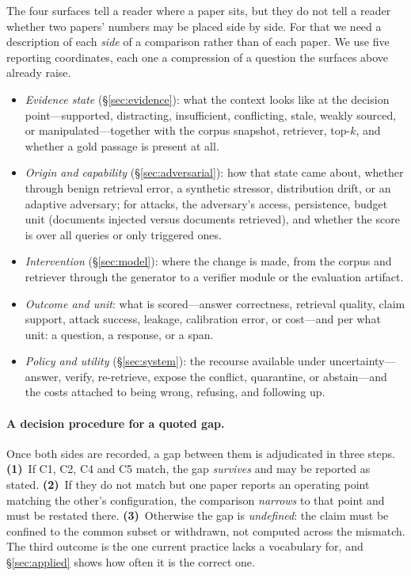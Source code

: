 The four surfaces tell a reader where a paper sits, but they do not tell a reader whether two
papers' numbers may be placed side by side. For that we need a description of each \emph{side}
of a comparison rather than of each paper. We use five reporting coordinates, each one a
compression of a question the surfaces above already raise.

\begin{itemize}[leftmargin=1.15em,itemsep=1.5pt,topsep=2.5pt,parsep=0pt]
\item[\textbf{C1}] \emph{Evidence state} (\S\ref{sec:evidence}): what the context looks like at
the decision point---supported, distracting, insufficient, conflicting, stale, weakly sourced,
or manipulated---together with the corpus snapshot, retriever, top-$k$, and whether a gold
passage is present at all.
\item[\textbf{C2}] \emph{Origin and capability} (\S\ref{sec:adversarial}): how that state came
about, whether through benign retrieval error, a synthetic stressor, distribution drift, or an
adaptive adversary; for attacks, the adversary's access, persistence, budget unit (documents
injected versus documents retrieved), and whether the score is over all queries or only
triggered ones.
\item[\textbf{C3}] \emph{Intervention} (\S\ref{sec:model}): where the change is made, from the
corpus and retriever through the generator to a verifier module or the evaluation artifact.
\item[\textbf{C4}] \emph{Outcome and unit}: what is scored---answer correctness, retrieval
quality, claim support, attack success, leakage, calibration error, or cost---and per what
unit: a question, a response, or a span.
\item[\textbf{C5}] \emph{Policy and utility} (\S\ref{sec:system}): the recourse available under
uncertainty---answer, verify, re-retrieve, expose the conflict, quarantine, or abstain---and the
costs attached to being wrong, refusing, and following up.
\end{itemize}

\paragraph{A decision procedure for a quoted gap.}
Once both sides are recorded, a gap between them is adjudicated in three steps.
\textbf{(1)}~If C1, C2, C4 and C5 match, the gap \emph{survives} and may be reported as stated.
\textbf{(2)}~If they do not match but one paper reports an operating point matching the other's
configuration, the comparison \emph{narrows} to that point and must be restated there.
\textbf{(3)}~Otherwise the gap is \emph{undefined}: the claim must be confined to the common
subset or withdrawn, not computed across the mismatch. The third outcome is the one current
practice lacks a vocabulary for, and \S\ref{sec:applied} shows how often it is the correct one.

